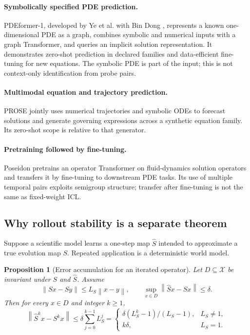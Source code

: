 \documentclass[11pt]{amsart}
\numberwithin{equation}{section}
\theoremstyle{definition}
\theoremstyle{plain}
\newtheorem{proposition}[definition]{Proposition}
\theoremstyle{remark}
\newcommand{\cX}{\mathcal{X}}
\newcommand{\norm}[1]{\left\lVert#1\right\rVert}
\begin{document}
\paragraph{\textbf{Symbolically specified PDE prediction.}}
PDEformer-1, developed by Ye et al. with Bin Dong
\cite{YeEtAl2024PDEformer}, represents a known one-dimensional PDE as a graph,
combines symbolic and numerical inputs with a graph Transformer, and queries an
implicit solution representation.  It demonstrates zero-shot prediction in
declared families and data-efficient fine-tuning for new equations.  The
symbolic PDE is part of the input; this is not context-only identification from
probe pairs.

\paragraph{\textbf{Multimodal equation and trajectory prediction.}}
PROSE \cite{LiuEtAl2024PROSE} jointly uses numerical trajectories and symbolic
ODEs to forecast solutions and generate governing expressions across a
synthetic equation family.  Its zero-shot scope is relative to that generator.

\paragraph{\textbf{Pretraining followed by fine-tuning.}}
Poseidon \cite{HerdeEtAl2024Poseidon} pretrains an operator Transformer on
fluid-dynamics solution operators and transfers it by fine-tuning to downstream
PDE tasks.  Its use of multiple temporal pairs exploits semigroup structure;
transfer after fine-tuning is not the same as fixed-weight ICL.

\subsection{Why rollout stability is a separate theorem}

Suppose a scientific model learns a one-step map $\widehat S$ intended to
approximate a true evolution map $S$.  Repeated application is a deterministic
world model.

\begin{proposition}[Error accumulation for an iterated operator]
\label{prop:deterministic-rollout}
Let $D\subseteq\cX$ be invariant under $S$ and $\widehat S$.  Assume
\begin{equation}\label{eq:rollout-assumptions}
 \norm{Sx-Sy}\le L_S\norm{x-y},
 \qquad
 \sup_{x\in D}\norm{\widehat Sx-Sx}\le\delta.
\end{equation}
Then for every $x\in D$ and integer $k\ge1$,
\begin{equation}\label{eq:rollout-bound}
 \norm{\widehat S^kx-S^kx}
 \le
 \delta\sum_{j=0}^{k-1}L_S^j
 =
 \begin{cases}
 \delta(L_S^k-1)/(L_S-1),&L_S\ne1,\\
 k\delta,&L_S=1.
 \end{cases}
\end{equation}
\end{proposition}
\end{document}
